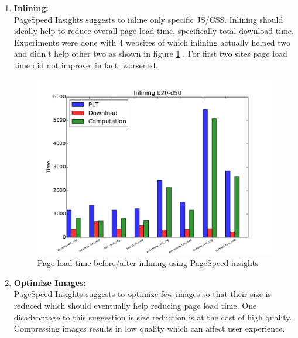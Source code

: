 \begin{enumerate}
\item {\textbf {Inlining:}}\\
PageSpeed Insights suggests to inline only specific JS/CSS. Inlining should ideally help to reduce overall page load time, specifically total download time.
Experiments were done with 4 websites of which inlining actually helped two and didn't help other two as shown in figure \ref{fig:InsightsInlining_b20_d50} . For first two sites page load time did not improve; in fact, worsened.

\begin{figure}[!htb]
  \centering
    \includegraphics[width=0.85 \textwidth]{./figures/optimization/InsightsInlining_b20_d50.pdf}
  \caption {Page load time before/after inlining using PageSpeed insights }
  \label{fig:InsightsInlining_b20_d50}
\end{figure}


\item  {\textbf {Optimize Images:}}\\
PageSpeed Insights suggests to optimize few images so that their size is reduced which should eventually help reducing page load time. One disadvantage to this suggestion is size reduction is at the cost of high quality. Compressing images results in low quality which can affect user experience.\\


\end{enumerate}
